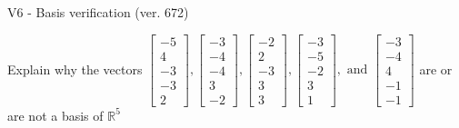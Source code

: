 \begin{exercise}
  \begin{exerciseTitle}V6 - Basis verification (ver. 672)\end{exerciseTitle}
  \begin{exerciseStatement}
    Explain why the vectors \(\left[\begin{array}{r}
-5 \\
4 \\
-3 \\
-3 \\
2
\end{array}\right] , \left[\begin{array}{r}
-3 \\
-4 \\
-4 \\
3 \\
-2
\end{array}\right] , \left[\begin{array}{r}
-2 \\
2 \\
-3 \\
3 \\
3
\end{array}\right] , \left[\begin{array}{r}
-3 \\
-5 \\
-2 \\
3 \\
1
\end{array}\right] , \text{ and } \left[\begin{array}{r}
-3 \\
-4 \\
4 \\
-1 \\
-1
\end{array}\right]\) are or are not a basis of \(\mathbb{R}^5\)	



\end{exerciseStatement}
\end{exercise}
